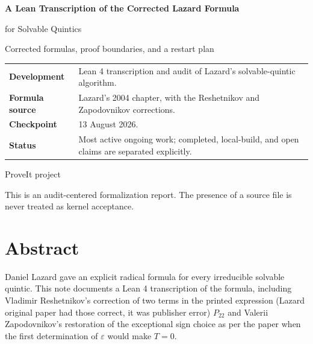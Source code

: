 \documentclass[11pt,a4paper,oneside]{article}
\newcommand{\eps}{\varepsilon}
\begin{document}
\color{Ink}
\hypersetup{pageanchor=false}
\begin{titlepage}
\thispagestyle{empty}
\centering
\vspace*{0.8in}
{\Huge\bfseries\color{Ink} A Lean Transcription of the Corrected Lazard Formula\par}
\vspace{0.25in}
{\LARGE\color{DeepBlue} for Solvable Quintics\par}
\vspace{0.2in}
{\large Corrected formulas, proof boundaries, and a restart plan\par}
\vspace{0.8in}
\begin{tcolorbox}[width=0.86\textwidth,colback=SoftGray,colframe=RuleGray,boxrule=0.7pt,arc=1mm]
\small
\begin{tabularx}{\textwidth}{@{}L{0.20\textwidth}Y@{}}
\textbf{Development} & Lean 4 transcription and audit of Lazard's solvable-quintic algorithm. \\
\textbf{Formula source} & Lazard's 2004 chapter, with the Reshetnikov and Zapodovnikov corrections. \\
\textbf{Checkpoint} & 13 August 2026. \\
\textbf{Status} & Most active ongoing work; completed, local-build, and open claims are separated explicitly. \\
\end{tabularx}
\end{tcolorbox}
\vfill
{\large ProveIt project\par}
\vspace{0.25in}
{\small This is an audit-centered formalization report.  The presence of a source file is never treated as kernel acceptance.\par}
\end{titlepage}
\clearpage
\hypersetup{pageanchor=true}
\section*{Abstract}
Daniel Lazard gave an explicit radical formula for every irreducible solvable
quintic.  This note documents a Lean 4 transcription of the formula, including
Vladimir Reshetnikov's correction of two terms in the printed expression (Lazard original paper had those correct, it was publisher error)
$P_{22}$ and Valerii Zapodovnikov's restoration of the exceptional sign choice
as per the paper when the first determination of $\eps$ would make $T=0$.
\end{document}
